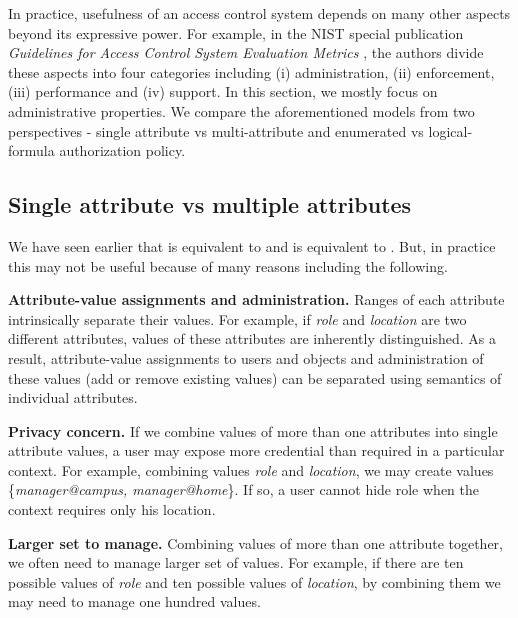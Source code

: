 \label{sec:beyond}
In practice, usefulness of an access control system depends on many other aspects beyond its expressive power. For example, in the NIST special publication \textit{Guidelines  for Access Control System Evaluation Metrics} \cite{access-control-evaluation}, the authors divide these aspects into four categories including (i) administration, (ii) enforcement, (iii) performance and (iv) support. In this section, we mostly focus on administrative properties. We compare the aforementioned models from two perspectives - single attribute vs multi-attribute and enumerated vs logical-formula authorization policy.

\subsection{Single attribute vs multiple attributes}

We have seen earlier that \EPOneOneModels{} is equivalent to \EPMNModel{} and \LPOneOne{} is equivalent to \LPMN{}. But, in practice this may not be useful because of many reasons including the following.

\textbf{Attribute-value assignments and administration.} Ranges of each attribute intrinsically separate their values. For example, if \textit{role} and \textit{location} are two different attributes, values of these attributes are inherently distinguished. As a result, attribute-value assignments to users and objects and administration of these values (add or remove existing values) can be separated using semantics of individual attributes.

\textbf{Privacy concern.} If we combine values of  more than one attributes into single attribute values, a user may expose more credential than required in a particular context.  For example, combining values \textit{role} and \textit{location}, we may create values \{\textit{manager@campus, manager@home}\}. If so, a user cannot hide role  when the context requires only his location.



\textbf{Larger set to manage.} Combining values of more than one attribute together, we often need to manage larger set of values. For example, if there are ten possible values of \textit{role} and ten possible values of \textit{location}, by combining them we may need to manage one hundred values.  



